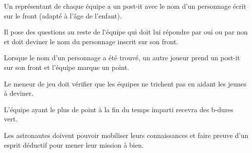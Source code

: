 \documentclass{grand-jeu}
\begin{document}
\begin{liste-materiel}
\end{liste-materiel}

\begin{regles}
Un représentant de chaque équipe a un post-it avec le nom d'un personnage écrit sur le front (adapté à l'âge de l'enfant).

Il pose des questions au reste de l'équipe qui doit lui répondre par oui ou par non et doit deviner le nom du personnage inscrit sur son front.

Lorsque le nom d'un personnage a été trouvé, un autre joueur prend un post-it sur son front et l'équipe marque un point.

Le meneur de jeu doit vérifier que les équipes ne trichent pas en aidant les jeunes à deviner.

L’équipe ayant le plus de point à la fin du temps imparti recevra des b-dures vert.
\end{regles}

\begin{imaginaire}
Les astronautes doivent pouvoir mobiliser leurs connaissances et faire preuve d'un esprit déductif pour mener leur mission à bien. 
\end{imaginaire}

\begin{moments-stop}
\end{moments-stop}
\end{document}
